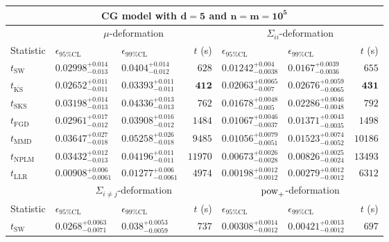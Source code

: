 \begin{tabular}{l|llr|llr}
	\toprule
	\multicolumn{7}{c}{{\bf CG model with $\mathbf{d=5}$ and $\mathbf{n=m=10^{5}}$}} \\
	\toprule
	\multicolumn{1}{c}{} & \multicolumn{3}{c}{$\mu$-deformation} & \multicolumn{3}{c}{$\Sigma_{ii}$-deformation} \\
	Statistic & $\epsilon_{95\%\mathrm{CL}}$ & $\epsilon_{99\%\mathrm{CL}}$ & $t$ (s) & $\epsilon_{95\%\mathrm{CL}}$ & $\epsilon_{99\%\mathrm{CL}}$ & $t$ (s) \\
	\midrule
	$t_{\mathrm{SW}}$ & $0.02998_{-0.013}^{+0.014}$ & $0.0404_{-0.012}^{+0.014}$ & $628$ & $0.01242_{-0.0038}^{+0.004}$ & $0.0167_{-0.0036}^{+0.0039}$ & $655$ \\
	$t_{\overline{\mathrm{KS}}}$ & ${\mathbf{0.02652_{-0.011}^{+0.011}}}$ & ${\mathbf{0.03393_{-0.011}^{+0.011}}}$ & ${\mathbf{412}}$ & $0.02063_{-0.007}^{+0.0065}$ & $0.02676_{-0.0065}^{+0.0059}$ & ${\mathbf{431}}$ \\
	$t_{\mathrm{SKS}}$ & $0.03198_{-0.013}^{+0.014}$ & $0.04336_{-0.013}^{+0.013}$ & $762$ & $0.01678_{-0.005}^{+0.0048}$ & $0.02286_{-0.0048}^{+0.0046}$ & $792$ \\
	$t_{\mathrm{FGD}}$ & $0.02961_{-0.012}^{+0.017}$ & $0.03908_{-0.012}^{+0.016}$ & $1484$ & $0.01067_{-0.0037}^{+0.0046}$ & ${\mathbf{0.01371_{-0.0035}^{+0.0043}}}$ & $1498$ \\
	$t_{\mathrm{MMD}}$ & $0.03647_{-0.018}^{+0.027}$ & $0.05258_{-0.018}^{+0.026}$ & $9485$ & ${\mathbf{0.01056_{-0.0051}^{+0.0079}}}$ & $0.01523_{-0.0052}^{+0.0074}$ & $10186$ \\
\rowcolor{red!35}	$t_{\mathrm{NPLM}}$ & $0.03432_{-0.013}^{+0.012}$ & $0.04196_{-0.011}^{+0.011}$ & $11970$ & $0.00673_{-0.0028}^{+0.0026}$ & $0.00826_{-0.0024}^{+0.0025}$ & $13493$ \\
	$t_{\mathrm{LLR}}$ & $0.00908_{-0.0061}^{+0.006}$ & $0.01277_{-0.0061}^{+0.006}$ & $4974$ & $0.00198_{-0.0012}^{+0.0012}$ & $0.00279_{-0.0012}^{+0.0012}$ & $6312$ \\
	\toprule
	\multicolumn{1}{c}{} & \multicolumn{3}{c}{$\Sigma_{i\neq j}$-deformation} & \multicolumn{3}{c}{$\rm{pow}_{+}$-deformation} \\
	Statistic & $\epsilon_{95\%\mathrm{CL}}$ & $\epsilon_{99\%\mathrm{CL}}$ & $t$ (s) & $\epsilon_{95\%\mathrm{CL}}$ & $\epsilon_{99\%\mathrm{CL}}$ & $t$ (s) \\
	\midrule
	$t_{\mathrm{SW}}$ & $0.0268_{-0.0071}^{+0.0063}$ & $0.038_{-0.0059}^{+0.0053}$ & $737$ & $0.00308_{-0.0012}^{+0.0014}$ & $0.00421_{-0.0012}^{+0.0013}$ & $697$ \\

\end{tabular}
